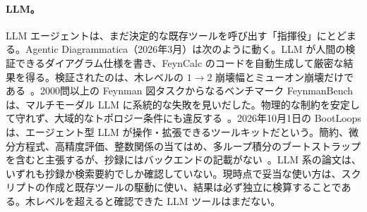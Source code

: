 \documentclass[a4paper,10pt]{ltjsarticle}
\begin{document}
\paragraph{LLM。}LLM エージェントは、まだ決定的な既存ツールを呼び出す「指揮役」にとどまる。Agentic Diagrammatica（2026年3月）は次のように動く。LLM が人間の検証できるダイアグラム仕様を書き、FeynCalc のコードを自動生成して厳密な結果を得る。検証されたのは、木レベルの $1\to 2$ 崩壊幅とミューオン崩壊だけである~\cite{r171}。2000問以上の Feynman 図タスクからなるベンチマーク FeynmanBench は、マルチモーダル LLM に系統的な失敗を見いだした。物理的な制約を安定して守れず、大域的なトポロジー条件にも違反する~\cite{r172}。2026年10月1日の BootLoops は、エージェント型 LLM が操作・拡張できるツールキットだという。簡約、微分方程式、高精度評価、整数関係の当てはめ、多ループ積分のブートストラップを含むと主張するが、抄録にはバックエンドの記載がない~\cite{r173}。LLM 系の論文は、いずれも抄録か検索要約でしか確認していない。現時点で妥当な使い方は、スクリプトの作成と既存ツールの駆動に使い、結果は必ず独立に検算することである。木レベルを超えると確認できた LLM ツールはまだない。
\end{document}
